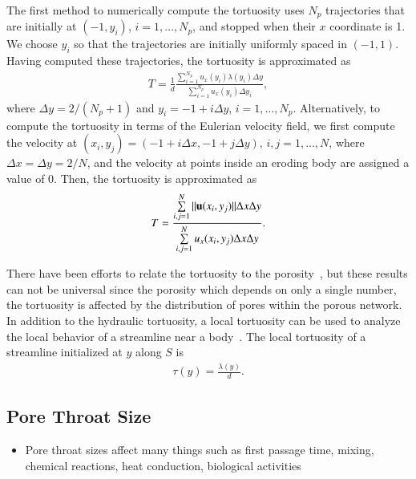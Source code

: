 \documentclass[preprint, 10pt]{elsarticle}
\begin{document}
The first method to numerically compute the tortuosity uses $N_p$
trajectories that are initially at $(-1,y_i)$, $i=1,\ldots,N_p$, and
stopped when their $x$ coordinate is 1.  We choose $y_i$ so that the
trajectories are initially uniformly spaced in $(-1,1)$.  Having
computed these trajectories, the tortuosity is approximated as
\begin{align}
  T = \frac{1}{d}\frac{\displaystyle\sum_{i=1}^{N_p} 
    u_x(y_i) \lambda(y_i) \Delta y}
  {\displaystyle\sum_{i=1}^{N_p} u_x(y_i) \Delta y_i}, 
\end{align}
where $\Delta y = 2/(N_p + 1)$ and $y_i = -1 + i \Delta y$,
$i=1,\ldots,N_p$.  Alternatively, to compute the tortuosity in terms of
the Eulerian velocity field, we first compute the velocity at $(x_i,y_j)
= (-1 + i\Delta x, -1 + j\Delta y)$, $i,j=1,\ldots,N$, where $\Delta x =
\Delta y = 2/N$, and the velocity at points inside an eroding body are
assigned a value of 0.  Then, the tortuosity is approximated as
\begin{align}
  T = \frac{\sum\limits_{i,j=1}^N \|{\mathbf{u}}(x_i,y_j)\|\Delta x \Delta y}
      {\sum\limits_{i,j=1}^N u_x(x_i,y_j) \Delta x \Delta y}.
\end{align}

There have been efforts to relate the tortuosity to the
porosity~\cite{matyka2008tortuosity}, but these results can not be
universal since the porosity which depends on only a single number, the
tortuosity is affected by the distribution of pores within the porous
network.  In addition to the hydraulic tortuosity, a local tortuosity
can be used to analyze the local behavior of a streamline near a
body~\cite{matyka2008tortuosity}.  The local tortuosity of a streamline
initialized at $y$ along $S$ is
\begin{align}
  \tau(y) = \frac{\lambda(y)}{d}.
  \label{eqn:localTort}
\end{align}


\subsection{Pore Throat Size}
\begin{itemize}
  \item Pore throat sizes affect many things such as first passage time,
  mixing, chemical reactions, heat conduction, biological activities
\end{itemize}
\end{document}
